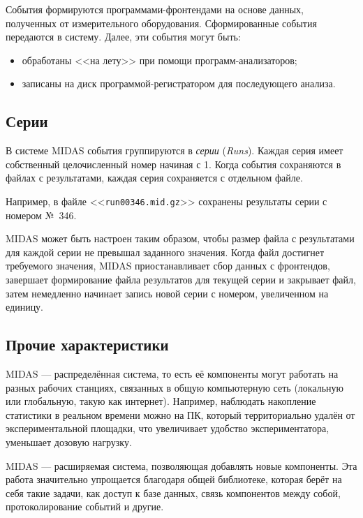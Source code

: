 \documentclass[12pt, a4paper, oneside, onecolumn]{book}
\newcommand{\MIDAS}{\mbox{MIDAS}}
\newcommand{\TERM}[1]{{\it #1}}
\newcommand{\FILE}[1]{<<{\tt #1}>>}
\begin{document}
События формируются программами-фронтендами на основе данных, полученных от измерительного оборудования. Сформированные события передаются в систему. Далее, эти события могут быть:

\begin{itemize}
\item обработаны <<на лету>> при помощи программ-анализаторов;
\item записаны на диск программой-регистратором для последующего анализа.
\end{itemize}

\subsection{Серии}
\label{sec-midas-run}

В системе \MIDAS{} события группируются в \TERM{серии} (\TERM{Runs}). Каждая серия имеет собственный целочисленный номер начиная с 1. Когда события сохраняются в файлах с результатами, каждая серия сохраняется с отдельном файле.

Например, в файле \FILE{run00346.mid.gz} сохранены результаты серии с номером №~346.

\MIDAS{} может быть настроен таким образом, чтобы размер файла с результатами для каждой серии не превышал заданного значения. Когда файл достигнет требуемого значения, \MIDAS{} приостанавливает сбор данных с фронтендов, завершает формирование файла результатов для текущей серии и закрывает файл, затем немедленно начинает запись новой серии с номером, увеличенном на единицу.

\subsection{Прочие характеристики}

\MIDAS{} --- распределённая система, то есть её компоненты могут работать на разных рабочих станциях, связанных в общую компьютерную сеть (локальную или глобальную, такую как интернет). Например, наблюдать накопление статистики в реальном времени можно на ПК, который территориально удалён от экспериментальной площадки, что увеличивает удобство экспериментатора, уменьшает дозовую нагрузку.

\MIDAS{} --- расширяемая система, позволяющая добавлять новые компоненты. Эта работа значительно упрощается благодаря общей библиотеке, которая берёт на себя такие задачи, как доступ к базе данных, связь компонентов между собой, протоколирование событий и другие.
\end{document}
